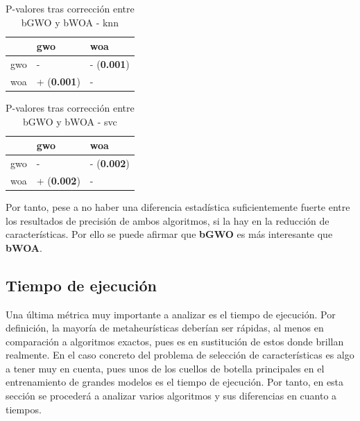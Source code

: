 \begin{table}[htp]
    \centering
    \begin{tabular}{lll}
        \toprule
        {}  & gwo                & woa                \\
        \midrule
        gwo & -                  & - (\textbf{0.001}) \\
        woa & + (\textbf{0.001}) & -                  \\
        \bottomrule
    \end{tabular}
    \caption{P-valores tras corrección entre bGWO y bWOA - knn}
    \label{tab:pval_corr_gwo_woa-bin_knn}
\end{table}

\begin{table}[htp]
    \centering
    \begin{tabular}{lll}
        \toprule
        {}  & gwo                & woa                \\
        \midrule
        gwo & -                  & - (\textbf{0.002}) \\
        woa & + (\textbf{0.002}) & -                  \\
        \bottomrule
    \end{tabular}
    \caption{P-valores tras corrección entre bGWO y bWOA - svc}
    \label{tab:pval_corr_gwo_woa-bin_svc}
\end{table}

Por tanto, pese a no haber una diferencia estadística suficientemente fuerte entre los resultados de precisión de ambos algoritmos, si la hay en la reducción de características. Por ello se puede afirmar que \textbf{bGWO} es más interesante que \textbf{bWOA}.

\clearpage
\subsection{Tiempo de ejecución}
Una última métrica muy importante a analizar es el tiempo de ejecución. Por definición, la mayoría de metaheurísticas deberían ser rápidas, al menos en comparación a algoritmos exactos, pues es en sustitución de estos donde brillan realmente. En el caso concreto del problema de selección de características es algo a tener muy en cuenta, pues unos de los cuellos de botella principales en el entrenamiento de grandes modelos es el tiempo de ejecución. Por tanto, en esta sección se procederá a analizar varios algoritmos y sus diferencias en cuanto a tiempos.\\[6pt]

